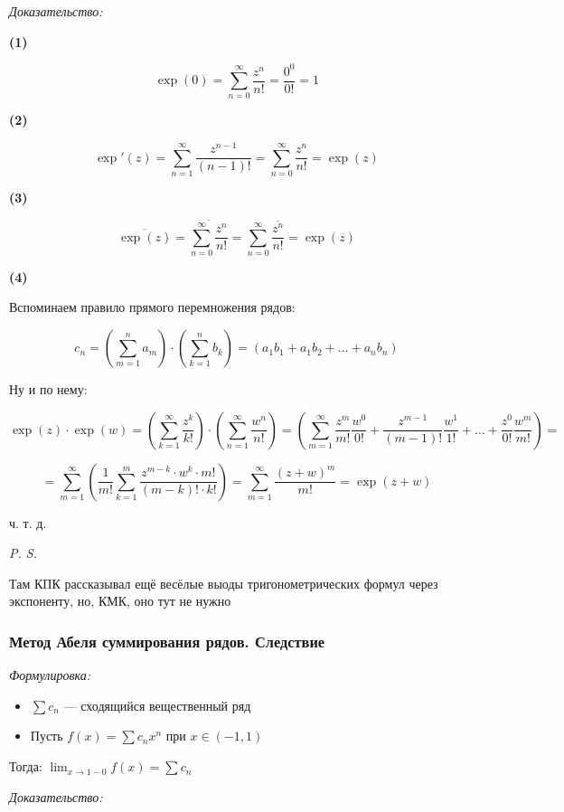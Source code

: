 \documentclass{article}
\begin{document}
\textit{Доказательство:}

\textbf{(1)}

\[\exp(0) = \sum_{n = 0}^{\infty} \frac{z^n}{n!} = \frac{0^0}{0!} = 1\]

\textbf{(2)}

\[\exp'(z) = \sum_{n = 1}^{\infty} \frac{z^{n - 1}}{(n - 1)!} = \sum_{n = 0}^{\infty} \frac{z^n}{n!} = \exp(z)\]

\textbf{(3)}

\[\overline{\exp(z)} = \overline{\sum_{n = 0}^{\infty} \frac{z^n}{n!}} = \sum_{n = 0}^{\infty} \frac{\overline{z^n}}{n!} = \exp(\overline{z})\]

\textbf{(4)}

Вспоминаем правило прямого перемножения рядов:

\[c_n = \left(\sum_{m = 1}^{n} a_m \right) \cdot \left(\sum_{k = 1}^{n} b_k \right) = (a_1b_1 + a_1b_2 + \ldots + a_nb_n)\]

Ну и по нему: 

\[\exp(z) \cdot \exp(w) = \left(\sum_{k = 1}^{\infty} \frac{z^k}{k!} \right) \cdot \left(\sum_{n = 1}^{\infty} \frac{w^n}{n!} \right) = \left(\sum_{m = 1}^{\infty} \frac{z^m}{m!}\frac{w^0}{0!} + \frac{z^{m - 1}}{(m - 1)!}\frac{w^1}{1!} + \ldots + \frac{z^0}{0!}\frac{w^m}{m!}\right) =\]

\[= \sum_{m = 1}^{\infty} \left(\frac{1}{m!} \sum_{k = 1}^{m} \frac{z^{m - k} \cdot w^k \cdot m!}{(m - k)! \cdot k!}\right) = \sum_{m = 1}^{\infty}\frac{(z + w)^m}{m!} = \exp(z + w)\]

ч. т. д.

\textit{P. S.}

Там КПК рассказывал ещё весёлые выоды тригонометрических формул через экспоненту, но, КМК, оно тут не нужно

\subsubsection{Метод Абеля суммирования рядов. Следствие}
\textit{Формулировка:}

\begin{itemize}
    \item $\sum c_n$ --- сходящийся вещественный ряд
    \item Пусть $f(x) = \sum c_nx^n$ при $x \in (-1, 1)$
\end{itemize}

Тогда: $\lim_{x \rightarrow 1 - 0} f(x) = \sum c_n$

\textit{Доказательство:}
\end{document}
